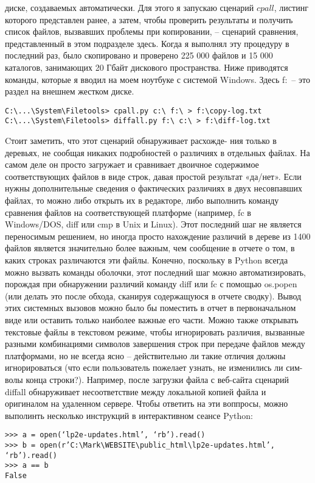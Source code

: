 \documentclass[12pt]{article}
\begin{document}
диске, создаваемых автоматически. Для этого я запускаю сценарий
$cpall$, листинг которого представлен ранее, а затем,
чтобы проверить результаты и получить список файлов, вызвавших
проблемы при копировании, – сценарий сравнения, представленный в этом подразделе
здесь. Когда я выполнял эту процедуру в последний раз, было скопировано и проверено 225 000 файлов и 15 000 каталогов, занимающих
20 Гбайт дискового пространства.
Ниже приводятся команды, которые я вводил на моем
ноутбуке с сис­темой Windows. Здесь f:\ – это раздел на внешнем жестком диске.
\begin{verbatim}
C:\...\System\Filetools> cpall.py c:\ f:\ > f:\copy-log.txt
C:\...\System\Filetools> diffall.py f:\ c:\ > f:\diff-log.txt
\end{verbatim}
Cтоит заметить, что этот сценарий обнаруживает расхожде-
ния только в деревьях, не сообщая никаких подробностей о различиях
в отдельных файлах. На самом деле он просто загружает и сравнивает двоичное содержимое соответствующих файлов в виде строк, давая
простой результат «да/нет».
Если нужны дополнительные сведения о фактических различиях в двух несовпавших файлах, то можно либо открыть их в редакторе, либо
выполнить команду сравнения файлов на соответствующей платформе
(например, fc в Windows/DOS, diff или cmp в Unix и Linux). Этот последний шаг не является переносимым решением, но иногда просто нахождение различий в дереве из 1400 файлов является
значительно более важным, чем сообщение в отчете о том, в каких строках различаются эти файлы.
Конечно, поскольку в Python всегда можно вызвать команды оболочки,
этот последний шаг можно автоматизировать, порождая при обнаружении различий команду diff или fc с помощью os.popen (или делать
это после обхода, сканируя содержащуюся в отчете сводку). Вывод этих
сис­темных вызовов можно было бы поместить в отчет в первоначальном
виде или оставить только наиболее важные его части.
Можно также открывать текстовые файлы в текстовом режиме,
чтобы игнорировать различия, вызванные разными комбинациями
символов завершения строк при передаче файлов между платформами,
но не всегда ясно – действительно ли такие отличия должны игнорироваться (что если пользователь пожелает узнать, не изменились ли сим-
волы конца строки?). Например, после загрузки файла с веб-сайта сценарий
diffall обнаруживает несоответствие между локальной копией файла
и оригиналом на удаленном сервере. Чтобы ответить на эти воппросы, можно выполинть несколько инструкций в интерактивном сеансе Python:
\begin{verbatim}
>>> a = open(‘lp2e-updates.html’, ‘rb’).read()
>>> b = open(r’C:\Mark\WEBSITE\public_html\lp2e-updates.html’, ‘rb’).read()
>>> a == b
False
\end{verbatim}
\end{document}
